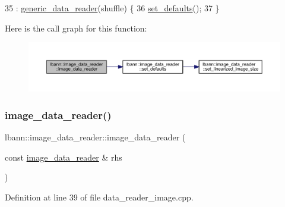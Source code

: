 \begin{DoxyCode}
35   : \hyperlink{classlbann_1_1generic__data__reader_aaba933b8f7c1227801f6e80d39986af4}{generic\_data\_reader}(shuffle) \{
36   \hyperlink{classlbann_1_1image__data__reader_a8e9dbeaa0239d56597455cc23787a21d}{set\_defaults}();
37 \}
\end{DoxyCode}
Here is the call graph for this function\+:\nopagebreak
\begin{figure}[H]
\begin{center}
\leavevmode
\includegraphics[width=350pt]{classlbann_1_1image__data__reader_a582185ab03c4643117fd93e0ba843882_cgraph}
\end{center}
\end{figure}
\mbox{\label{classlbann_1_1image__data__reader_a7a5dd69d535f2966e4f8da53f505ca7c}} 
\subsubsection{\texorpdfstring{image\+\_\+data\+\_\+reader()}{image\_data\_reader()}\hspace{0.1cm}{\footnotesize\ttfamily [2/2]}}
{\footnotesize\ttfamily lbann\+::image\+\_\+data\+\_\+reader\+::image\+\_\+data\+\_\+reader (\begin{DoxyParamCaption}\item[{const \hyperlink{classlbann_1_1image__data__reader}{image\+\_\+data\+\_\+reader} \&}]{rhs }\end{DoxyParamCaption})}



Definition at line 39 of file data\+\_\+reader\+\_\+image.\+cpp.


